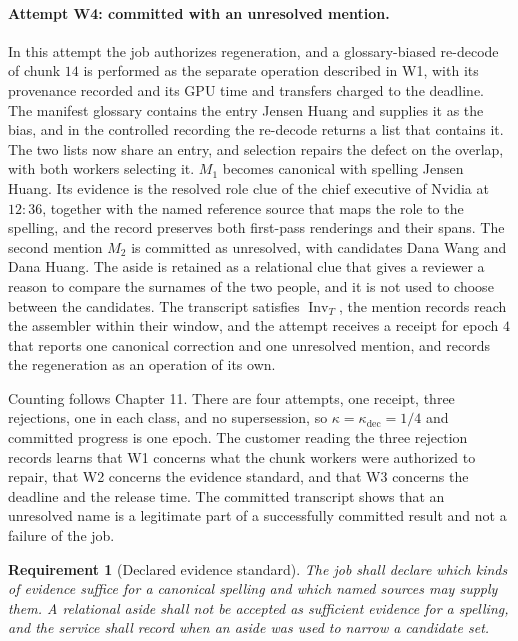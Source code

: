 \documentclass[11pt,openany]{book}
\newtheorem{requirement}{Requirement}[chapter]
\theoremstyle{remark}
\begin{document}
\paragraph{Attempt W4: committed with an unresolved mention.} In this attempt the job authorizes regeneration, and a glossary-biased re-decode of chunk $14$ is performed as the separate operation described in W1, with its provenance recorded and its GPU time and transfers charged to the deadline. The manifest glossary contains the entry Jensen Huang and supplies it as the bias, and in the controlled recording the re-decode returns a list that contains it. The two lists now share an entry, and selection repairs the defect on the overlap, with both workers selecting it. $M_1$ becomes canonical with spelling Jensen Huang. Its evidence is the resolved role clue of the chief executive of Nvidia at $12{:}36$, together with the named reference source that maps the role to the spelling, and the record preserves both first-pass renderings and their spans. The second mention $M_2$ is committed as unresolved, with candidates Dana Wang and Dana Huang. The aside is retained as a relational clue that gives a reviewer a reason to compare the surnames of the two people, and it is not used to choose between the candidates. The transcript satisfies $\operatorname{Inv}_T$, the mention records reach the assembler within their window, and the attempt receives a receipt for epoch $4$ that reports one canonical correction and one unresolved mention, and records the regeneration as an operation of its own.

Counting follows Chapter 11. There are four attempts, one receipt, three rejections, one in each class, and no supersession, so $\kappa=\kappa_{\mathrm{dec}}=1/4$ and committed progress is one epoch. The customer reading the three rejection records learns that W1 concerns what the chunk workers were authorized to repair, that W2 concerns the evidence standard, and that W3 concerns the deadline and the release time. The committed transcript shows that an unresolved name is a legitimate part of a successfully committed result and not a failure of the job.

\begin{requirement}[Declared evidence standard]
The job shall declare which kinds of evidence suffice for a canonical spelling and which named sources may supply them. A relational aside shall not be accepted as sufficient evidence for a spelling, and the service shall record when an aside was used to narrow a candidate set.
\end{requirement}
\end{document}
